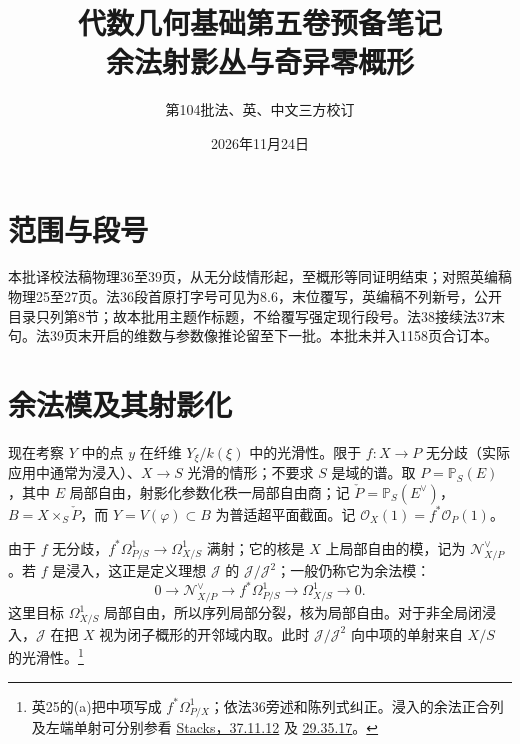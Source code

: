 \documentclass[openany,fontset=fandol]{ctexbook}
\newcommand{\PP}{\mathbb P}
\newcommand{\Ocal}{\mathcal O}
\newcommand{\N}{\mathcal N}
\newcommand{\Pdual}{\check P}
\begin{document}
\title{代数几何基础第五卷预备笔记\\余法射影丛与奇异零概形}
\author{第104批\quad 法、英、中文三方校订}
\date{2026年11月24日}
\maketitle

\section*{范围与段号}
本批译校法稿物理36至39页，从无分歧情形起，至概形等同证明结束；对照英编稿物理25至27页。法36段首原打字号可见为8.6，末位覆写，英编稿不列新号，公开目录只列第8节；故本批用主题作标题，不给覆写强定现行段号。法38接续法37末句。法39页末开启的维数与参数像推论留至下一批。本批未并入1158页合订本。

\section*{余法模及其射影化}
现在考察 $Y$ 中的点 $y$ 在纤维 $Y_\xi/k(\xi)$ 中的光滑性。限于 $f:X\to P$ 无分歧（实际应用中通常为浸入）、$X\to S$ 光滑的情形；不要求 $S$ 是域的谱。取 $P=\PP_S(E)$，其中 $E$ 局部自由，射影化参数化秩一局部自由商；记 $\Pdual=\PP_S(E^\vee)$，$B=X\times_S\Pdual$，而 $Y=V(\varphi)\subset B$ 为普适超平面截面。记 $\Ocal_X(1)=f^*\Ocal_P(1)$。

由于 $f$ 无分歧，$f^*\Omega^1_{P/S}\to\Omega^1_{X/S}$ 满射；它的核是 $X$ 上局部自由的模，记为 $\N^\vee_{X/P}$。若 $f$ 是浸入，这正是定义理想 $\mathcal J$ 的 $\mathcal J/\mathcal J^2$；一般仍称它为余法模：
\begin{equation*}\tag{a}
0\longrightarrow \N^\vee_{X/P}\longrightarrow f^*\Omega^1_{P/S}
 \longrightarrow \Omega^1_{X/S}\longrightarrow0.
\end{equation*}
\noindent 这里目标 $\Omega^1_{X/S}$ 局部自由，所以序列局部分裂，核为局部自由。对于非全局闭浸入，$\mathcal J$ 在把 $X$ 视为闭子概形的开邻域内取。此时 $\mathcal J/\mathcal J^2$ 向中项的单射来自 $X/S$ 的光滑性。\footnote{英25的(a)把中项写成 $f^*\Omega^1_{P/X}$；依法36旁述和陈列式纠正。浸入的余法正合列及左端单射可分别参看 \href{https://stacks.math.columbia.edu/tag/06B7}{Stacks，37.11.12} 及 \href{https://stacks.math.columbia.edu/tag/01V4}{29.35.17}。}
\end{document}
